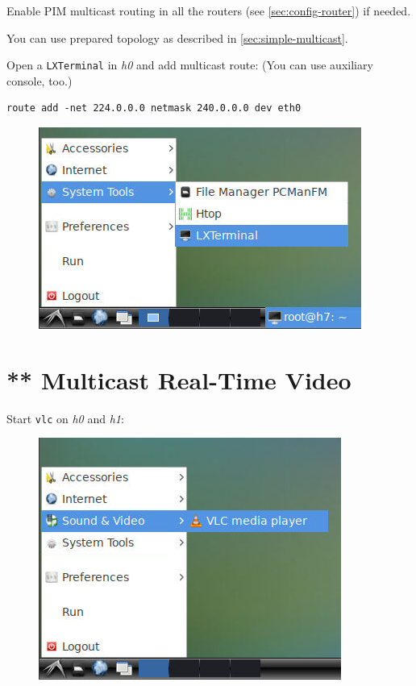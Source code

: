 \documentclass{../UTNetLab}
\begin{document}
     Enable PIM multicast routing in all the routers (see \autoref{sec:config-router}) if needed.

    You can use prepared topology as described in \autoref{sec:simple-multicast}.    

    Open a \texttt{LXTerminal} in \textit{h0} and add multicast route: (You can use auxiliary console, too.)

    \begin{lstlisting}[emph={eth0}]
route add -net 224.0.0.0 netmask 240.0.0.0 dev eth0
    \end{lstlisting}

    \begin{figure}[H]
        \centering
        \includegraphics[scale=2.0]{img/terminal}
    \end{figure}

\section{** Multicast Real-Time Video}
    Start \lstinline{vlc} on \textit{h0} and \textit{h1}:
    \begin{figure}[H]
        \centering
        \includegraphics[scale=2.0]{img/vlc-open}
    \end{figure}
\end{document}
